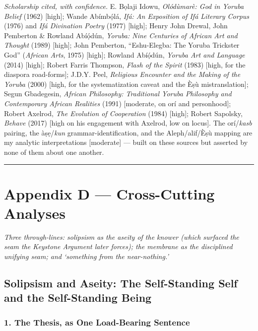 \documentclass[11pt]{article}
\begin{document}
\emph{Scholarship cited, with confidence.} E. Bọlaji Idowu, \emph{Olódùmarè: God in Yoruba Belief} (1962) [high]; Wande Abímbọ́lá, \emph{Ifá: An Exposition of Ifá Literary Corpus} (1976) and \emph{Ifá Divination Poetry} (1977) [high]; Henry John Drewal, John Pemberton \& Rowland Abíọ́dún, \emph{Yoruba: Nine Centuries of African Art and Thought} (1989) [high]; John Pemberton, ``Eshu-Elegba: The Yoruba Trickster God'' (\emph{African Arts}, 1975) [high]; Rowland Abíọ́dún, \emph{Yoruba Art and Language} (2014) [high]; Robert Farris Thompson, \emph{Flash of the Spirit} (1983) [high, for the diaspora road-forms]; J.D.Y. Peel, \emph{Religious Encounter and the Making of the Yoruba} (2000) [high, for the systematization caveat and the Èṣù mistranslation]; Segun Gbadegesin, \emph{African Philosophy: Traditional Yoruba Philosophy and Contemporary African Realities} (1991) [moderate, on orí and personhood]; Robert Axelrod, \emph{The Evolution of Cooperation} (1984) [high]; Robert Sapolsky, \emph{Behave} (2017) [high on his engagement with Axelrod, low on locus]. The orí/\allowbreak{}\emph{kasb} pairing, the àṣẹ/\allowbreak{}\emph{kun} grammar-identification, and the Aleph/\allowbreak{}alif/\allowbreak{}Èṣù mapping are my analytic interpretations [moderate] — built on these sources but asserted by none of them about one another.

\medskip\noindent\rule{\linewidth}{0.3pt}\medskip

\section*{Appendix D — Cross-Cutting Analyses}

\emph{Three through-lines: solipsism as the aseity of the knower (which surfaced the seam the Keystone Argument later forces); the membrane as the disciplined unifying seam; and `something from the near-nothing.'}

\subsection*{Solipsism and Aseity: The Self-Standing Self and the Self-Standing Being}

\subsubsection*{1. The Thesis, as One Load-Bearing Sentence}
\end{document}
